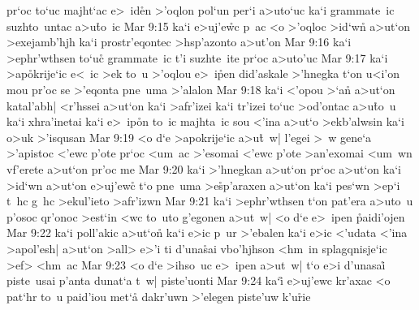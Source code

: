 pr`oc
to`uc
majht`ac
e>~id\r{e}n
>'oqlon
pol`un
per`i
a>uto`uc
ka`i
grammate~ic
suzhto~untac
a>u\r{t}o~ic\bibvsend
{}
\vs Mar 9:15
ka`i
e>uj'e\r{w}c
p~ac
<o
>'oqloc
>id`wn\r{}
a>ut`on
>exejamb'hjh
ka`i
prostr'eqontec
>hsp'azonto
a>ut'on\bibvsend
\vs Mar 9:16
ka`i
>ephr'wthsen
to`uc\r{}
grammate~ic
t'i
suzhte~ite
pr`oc
a>uto'uc\bibvsend
\vs Mar 9:17
ka`i
>ap\r{o}krije`ic
e<~ic
>ek
to~u
>'oqlou
e>~i\r{p}en
did'askale
>'hnegka
t`on
u<i'on
mou
pr'oc
se
>'eqonta
pne~uma
>'alalon\bibvsend
\vs Mar 9:18
ka`i
<'opou
>`a\r{n}
a>ut`on
katal'abh|
<r'hssei
a>ut`on
ka`i
>afr'izei
ka`i
tr'izei
to`uc
>od'ontac
a>u\r{t}o~u
ka`i
xhra'inetai
ka`i
e>~ip\r{o}n
to~ic
majhta~ic
sou
<'ina
a>ut`o
>ekb'alwsin
ka`i
o>uk
>'isqusan\bibvsend
\vs Mar 9:19
<o
d`e
>apokrije`ic
a>u\r{t}~w|
l'egei
>~w
gene`a
>'apistoc
<'ewc
p'ote
pr`oc
<um~ac
>'esomai
<'ewc
p'ote
>an'exomai
<um~wn
vf'erete
a>ut`on
pr'oc
me\bibvsend
\vs Mar 9:20
ka`i
>'hnegkan
a>ut`on
pr`oc
a>ut`on
ka`i
>id`wn
a>ut`on
e>uj'ewc\r{}
t`o
pne~uma
>e\r{s}p'araxen
a>ut`on
ka`i
pes`wn
>ep`i
t~hc
g~hc
>ekul'ieto
>afr'izwn\bibvsend
\vs Mar 9:21
ka`i
>ephr'wthsen
t`on
pat'era
a>uto~u
p'osoc
qr'onoc
>est`in
<wc
to~uto
g'egonen
a>ut~w|
<o
d`e
e>~ipen
\r{p}aidi'ojen\bibvsend
{}
\vs Mar 9:22
ka`i
poll'akic
a>ut`on\r{}
ka`i
e>ic
p~ur
>'ebalen
ka`i
e>ic
<'udata
<'ina
>apol'esh|
a>ut`on
>all>
e>'i
ti
d'una\r{s}ai
vbo'hjhson
<hm~in
splagqnisje`ic
>ef>
<hm~ac\bibvsend
\vs Mar 9:23
<o
d`e
>ihso~uc
e>~ipen
a>ut~w|
t`o
e>i
d'unasai\r{}
piste~usai
p'anta
dunat`a
t~w|
piste'uonti\bibvsend
\vs Mar 9:24
ka`i\r{}
e>uj'ewc
kr'axac
<o
pat`hr
to~u
paid'iou
met`a\r{}
dakr'uwn
>'elegen
piste'uw
k'u\r{r}ie
